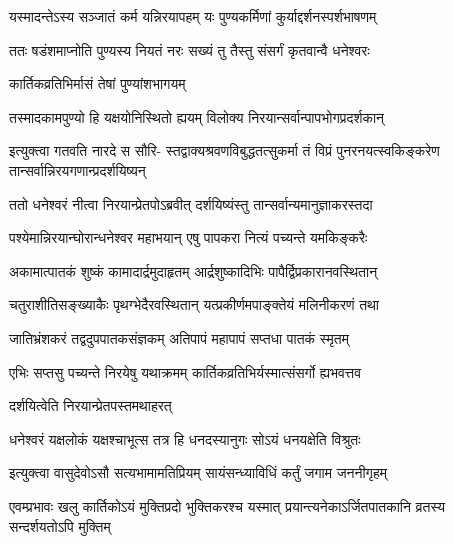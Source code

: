 \twolineshloka
{यस्मादन्तेऽस्य सञ्जातं कर्म यन्निरयापहम्}
{यः पुण्यकर्मिणां कुर्याद्दर्शनस्पर्शभाषणम्} %

\twolineshloka
{ततः षडंशमाप्नोति पुण्यस्य नियतं नरः}
{सख्यं तु तैस्तु संसर्गं कृतवान्वै धनेश्वरः} %


\onelineshloka
{कार्तिकव्रतिभिर्मासं तेषां पुण्यांशभागयम्} %

\twolineshloka
{तस्मादकामपुण्यो हि यक्षयोनिस्थितो ह्ययम्}
{विलोक्य निरयान्सर्वान्पापभोगप्रदर्शकान्} %


\fourlineindentedshloka
{इत्युक्त्वा गतवति नारदे स सौरि-}
{स्तद्वाक्यश्रवणविबुद्धतत्सुकर्मा}
{तं विप्रं पुनरनयत्स्वकिङ्करेण}
{तान्सर्वान्निरयगणान्प्रदर्शयिष्यन्} %


\twolineshloka
{ततो धनेश्वरं नीत्वा निरयान्प्रेतपोऽब्रवीत्}
{दर्शयिष्यंस्तु तान्सर्वान्यमानुज्ञाकरस्तदा} %


\twolineshloka
{पश्येमान्निरयान्घोरान्धनेश्वर महाभयान्}
{एषु पापकरा नित्यं पच्यन्ते यमकिङ्करैः} %

\twolineshloka
{अकामात्पातकं शुष्कं कामादार्द्रमुदाहृतम्}
{आर्द्रशुष्कादिभिः पापैर्द्विप्रकारानवस्थितान्} %

\twolineshloka
{चतुराशीतिसङ्ख्याकैः पृथग्भेदैरवस्थितान्}
{यत्प्रकीर्णमपाङ्क्तेयं मलिनीकरणं तथा} %

\twolineshloka
{जातिभ्रंशकरं तद्वदुपपातकसंज्ञकम्}
{अतिपापं महापापं सप्तधा पातकं स्मृतम्} %

\twolineshloka
{एभिः सप्तसु पच्यन्ते निरयेषु यथाक्रमम्}
{कार्तिकव्रतिभिर्यस्मात्संसर्गो ह्यभवत्तव} %




\onelineshloka
{दर्शयित्वेति निरयान्प्रेतपस्तमथाहरत्} %

\twolineshloka
{धनेश्वरं यक्षलोकं यक्षश्चाभूत्स तत्र हि}
{धनदस्यानुगः सोऽयं धनयक्षेति विश्रुतः} %


\twolineshloka
{इत्युक्त्वा वासुदेवोऽसौ सत्यभामामतिप्रियम्}
{सायंसन्ध्याविधिं कर्तुं जगाम जननीगृहम्} %


\twolineshloka
{एवम्प्रभावः खलु कार्तिकोऽयं मुक्तिप्रदो भुक्तिकरश्च यस्मात्}
{प्रयान्त्यनेकाऽर्जितपातकानि व्रतस्य सन्दर्शयतोऽपि मुक्तिम्} %





